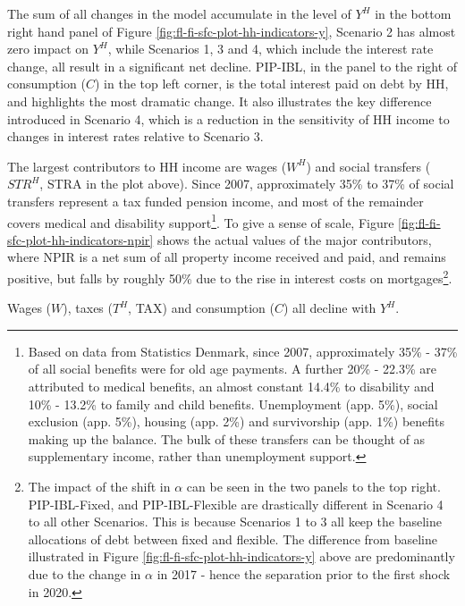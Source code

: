 \documentclass[
]{book}
\begin{document}
The sum of all changes in the model accumulate in the level of \(Y^H\) in the bottom right hand panel of Figure \ref{fig:fl-fi-sfc-plot-hh-indicators-y}, Scenario 2 has almost zero impact on \(Y^H\), while Scenarios 1, 3 and 4, which include the interest rate change, all result in a significant net decline. PIP-IBL, in the panel to the right of consumption (\(C\)) in the top left corner, is the total interest paid on debt by HH, and highlights the most dramatic change. It also illustrates the key difference introduced in Scenario 4, which is a reduction in the sensitivity of HH income to changes in interest rates relative to Scenario 3.

The largest contributors to HH income are wages (\(W^H\)) and social transfers (\(STR^H\), STRA in the plot above). Since 2007, approximately 35\% to 37\% of social transfers represent a tax funded pension income, and most of the remainder covers medical and disability support\footnote{Based on data from Statistics Denmark, since 2007, approximately 35\% - 37\% of all social benefits
  were for old age payments. A further 20\% - 22.3\% are attributed to medical benefits, an almost
  constant 14.4\% to disability and 10\% - 13.2\% to family and child benefits. Unemployment (app. 5\%),
  social exclusion (app. 5\%), housing (app. 2\%) and survivorship (app. 1\%) benefits making up the balance. The bulk of these transfers can be thought of as supplementary income, rather than unemployment support.}. To give a sense of scale, Figure \ref{fig:fl-fi-sfc-plot-hh-indicators-npir} shows the actual values of the major contributors, where NPIR is a net sum of all property income received and paid, and remains positive, but falls by roughly 50\% due to the rise in interest costs on mortgages\footnote{The impact of the shift in \(\alpha\) can be seen in the two panels to the top right. PIP-IBL-Fixed, and PIP-IBL-Flexible are drastically different in Scenario 4 to all other Scenarios. This is because Scenarios 1 to 3 all keep the baseline allocations of debt between fixed and flexible. The difference from baseline illustrated in Figure \ref{fig:fl-fi-sfc-plot-hh-indicators-y} above are predominantly due to the change in \(\alpha\) in 2017 - hence the separation prior to the first shock in 2020.}.

Wages (\(W\)), taxes (\(T^H\), TAX) and consumption (\(C\)) all decline with \(Y^H\).
\end{document}

